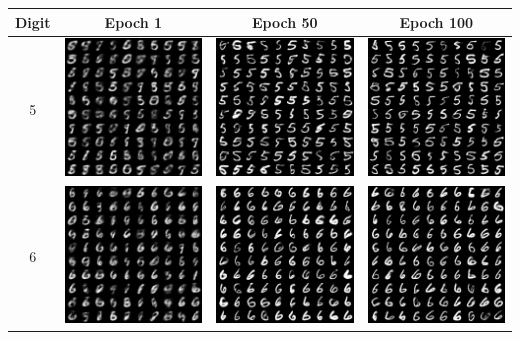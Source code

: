 \documentclass[12pt,a4paper]{article}
\begin{document}
	\begin{table}
		\centering
		\begin{tabular}{cccc}
			\toprule
			Digit & Epoch 1 & Epoch 50 & Epoch 100 \\
			\midrule
			5 & \includegraphics[width=4cm]{Figures/Epoch1_Label5} & \includegraphics[width=4cm]{Figures/Epoch50_Label5} & \includegraphics[width=4cm]{Figures/Epoch100_Label5}\\
			6 & \includegraphics[width=4cm]{Figures/Epoch1_Label6} & \includegraphics[width=4cm]{Figures/Epoch50_Label6} & \includegraphics[width=4cm]{Figures/Epoch100_Label6}  \\

\end{tabular}
\end{table}
\end{document}
